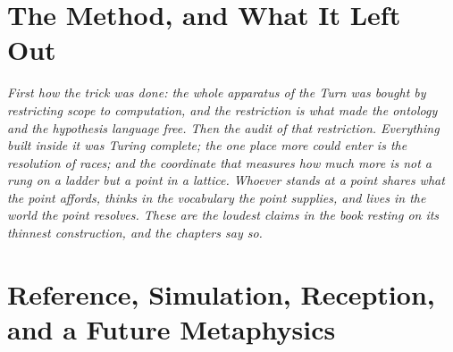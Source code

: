 \documentclass[12pt,openright,twoside]{book}
\theoremstyle{remark}
\theoremstyle{plain}
\theoremstyle{remark}
\theoremstyle{plain}
\theoremstyle{plain}
\begin{document}
\bigskip



\part{The Method, and What It Left Out}
\label{part:method}

\vspace{1em}
\begin{mdframed}[backgroundcolor=remarkgray, linecolor=gray!60,
                 linewidth=1pt, topline=false, rightline=false,
                 bottomline=false]
\small\itshape
First how the trick was done: the whole apparatus of the Turn was bought
by restricting scope to computation, and the restriction is what made the
ontology and the hypothesis language free.
Then the audit of that restriction.
Everything built inside it was Turing complete; the one place more could
enter is the resolution of races; and the coordinate that measures how
much more is not a rung on a ladder but a point in a lattice.
Whoever stands at a point shares what the point affords, thinks in the
vocabulary the point supplies, and lives in the world the point resolves.
These are the loudest claims in the book resting on its thinnest
construction, and the chapters say so.
\end{mdframed}

\bigskip


\part{Reference, Simulation, Reception, and a Future Metaphysics}
\label{part:reference}
\end{document}
